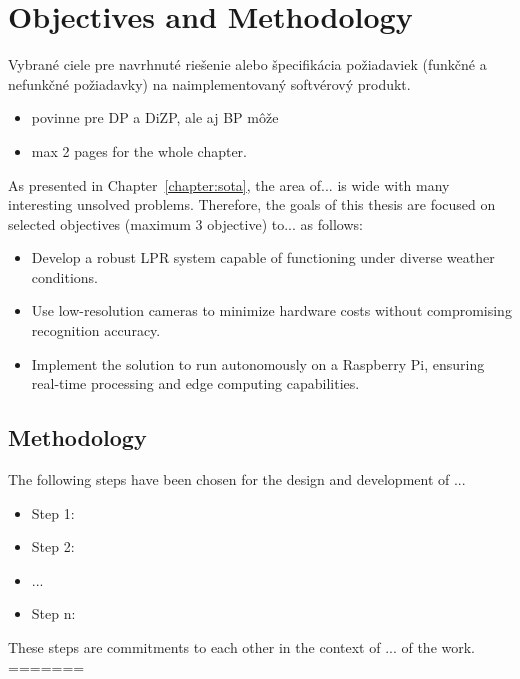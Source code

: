\chapter{Objectives and Methodology}
\label{chapter:objectives-and-methodology}
\label{sec:objectives}

Vybrané ciele pre navrhnuté riešenie alebo špecifikácia požiadaviek (funkčné a nefunkčné požiadavky) na naimplementovaný softvérový produkt.

\begin{itemize}
    \item povinne pre DP a DiZP, ale aj BP môže
    \item max 2 pages for the whole chapter.
\end{itemize}

As presented in Chapter~\ref{chapter:sota}, the area of... is wide with many interesting unsolved problems. Therefore, the goals of this thesis are focused on selected objectives (maximum 3 objective) to... as follows:

\begin{itemize}
    \item Develop a robust LPR system capable of functioning under diverse weather conditions.
    \item Use low-resolution cameras to minimize hardware costs without compromising recognition accuracy.
    \item Implement the solution to run autonomously on a Raspberry Pi, ensuring real-time processing and edge computing capabilities.
\end{itemize}


\section{Methodology}
\label{sec:methodology}

The following steps have been chosen for the design and development of ...

\begin{itemize}
    \item Step 1:
    \item Step 2:
    \item ...
    \item Step n:
\end{itemize}

These steps are commitments to each other in the context of ... of the work.
=======


